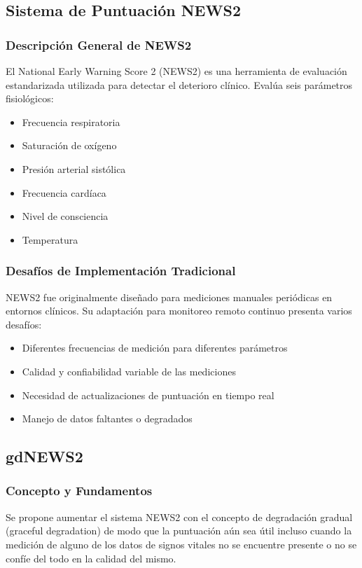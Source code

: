 \subsection{Sistema de Puntuación NEWS2}

\subsubsection{Descripción General de NEWS2}
El National Early Warning Score 2 (NEWS2) es una herramienta de evaluación estandarizada utilizada para detectar el deterioro clínico. Evalúa seis parámetros fisiológicos:
\begin{itemize}
    \item Frecuencia respiratoria
    \item Saturación de oxígeno
    \item Presión arterial sistólica
    \item Frecuencia cardíaca
    \item Nivel de consciencia
    \item Temperatura
\end{itemize}

\subsubsection{Desafíos de Implementación Tradicional}
NEWS2 fue originalmente diseñado para mediciones manuales periódicas en entornos clínicos. Su adaptación para monitoreo remoto continuo presenta varios desafíos:
\begin{itemize}
    \item Diferentes frecuencias de medición para diferentes parámetros
    \item Calidad y confiabilidad variable de las mediciones
    \item Necesidad de actualizaciones de puntuación en tiempo real
    \item Manejo de datos faltantes o degradados
\end{itemize}

\subsection{gdNEWS2}

\subsubsection{Concepto y Fundamentos}
Se propone aumentar el sistema NEWS2 con el concepto de degradación gradual (graceful degradation) de modo que la puntuación aún sea útil incluso cuando la medición de alguno de los datos de signos vitales no 
se encuentre presente o no se confíe del todo en la calidad del mismo.\newline

